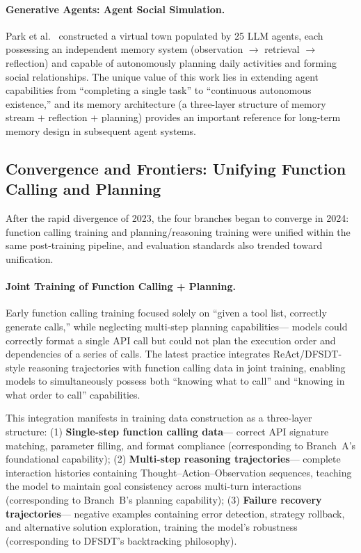 \paragraph{Generative Agents: Agent Social Simulation.}
Park et al.\ \cite{park2023generativeagents} constructed a virtual town populated by 25 LLM agents,
each possessing an independent memory system (observation $\rightarrow$ retrieval $\rightarrow$ reflection)
and capable of autonomously planning daily activities and forming social relationships.
The unique value of this work lies in extending agent capabilities from ``completing a single task'' to ``continuous autonomous existence,''
and its memory architecture (a three-layer structure of memory stream + reflection + planning)
provides an important reference for long-term memory design in subsequent agent systems.


\subsection{Convergence and Frontiers: Unifying Function Calling and Planning}
\label{sec:t6-convergence}

After the rapid divergence of 2023, the four branches began to converge in 2024: function calling training and planning/reasoning training were unified within the same post-training pipeline, and evaluation standards also trended toward unification.

\paragraph{Joint Training of Function Calling + Planning.}
Early function calling training focused solely on ``given a tool list, correctly generate calls,''
while neglecting multi-step planning capabilities---
models could correctly format a single API call
but could not plan the execution order and dependencies of a series of calls.
The latest practice integrates ReAct/DFSDT-style reasoning trajectories
with function calling data in joint training,
enabling models to simultaneously possess both ``knowing what to call'' and ``knowing in what order to call'' capabilities.

This integration manifests in training data construction as a three-layer structure:
(1) \textbf{Single-step function calling data}---
correct API signature matching, parameter filling, and format compliance
(corresponding to Branch~A's foundational capability);
(2) \textbf{Multi-step reasoning trajectories}---
complete interaction histories containing Thought--Action--Observation sequences,
teaching the model to maintain goal consistency across multi-turn interactions
(corresponding to Branch~B's planning capability);
(3) \textbf{Failure recovery trajectories}---
negative examples containing error detection, strategy rollback, and alternative solution exploration,
training the model's robustness
(corresponding to DFSDT's backtracking philosophy).


